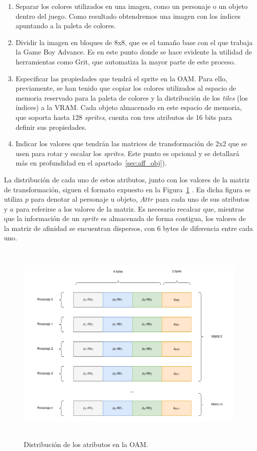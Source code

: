 \begin{enumerate}
	\item Separar los colores utilizados en una imagen, como un personaje o un objeto dentro del juego. Como resultado obtendremos una imagen con los índices apuntando a la paleta de colores.
	\item Dividir la imagen en bloques de 8x8, que es el tamaño base con el que trabaja la Game Boy Advance. Es en este punto donde se hace evidente la utilidad de herramientas como Grit, que automatiza la mayor parte de este proceso.
	\item Especificar las propiedades que tendrá el sprite en la OAM. Para ello, previamente, se han tenido que copiar los colores utilizados al espacio de memoria reservado para la paleta de colores y la distribución de los \textit{tiles} (los índices) a la VRAM.  Cada objeto almacenado en este espacio de memoria, que soporta hasta 128 \textit{sprites}, cuenta con tres atributos de 16 bits para definir sus propiedades.
	\item Indicar los valores que tendrán las matrices de transformación de 2x2 que se usen para rotar y escalar los \textit{sprites}. Este punto es opcional y se detallará más en profundidad en el apartado~\ref{sec:aff_obj}).
\end{enumerate}

La distribución de cada uno de estos atributos, junto con los valores de la matriz de transformación, siguen el formato expuesto en la Figura~\ref{fig:oam_dist} \cite{bib:tonc}. En dicha figura se utiliza $p$ para denotar al personaje u objeto, $Attr$ para cada uno de sus atributos y $a$ para referirse a los valores de la matriz. Es necesario recalcar que, mientras que la información de un \textit{sprite} es almacenada de forma contigua, los valores de la matriz de afinidad se encuentran dispersos, con 6 bytes de diferencia entre cada uno.

\begin{figure}[h]
	\centering
	\includegraphics[height=10cm]{capitulos/capitulo3/oam_dist.png}
	\caption{Distribución de los atributos en la OAM.}
	\label{fig:oam_dist}
\end{figure}
\FloatBarrier{}

